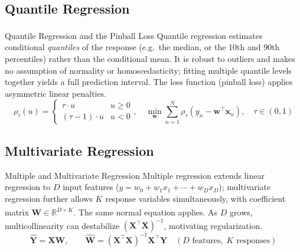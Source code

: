 \subsection{Quantile Regression}

\begin{v3topic}{Quantile Regression and the Pinball Loss}
    Quantile regression\textsuperscript{\cite{koenkerRegressionQuantiles1978}} estimates conditional \emph{quantiles} of the response (e.g.\ the median, or the 10th and 90th percentiles) rather than the conditional mean. It is robust to outliers and makes no assumption of normality or homoscedasticity; fitting multiple quantile levels together yields a full prediction interval. The loss function (pinball loss) applies asymmetric linear penalties.
\visualseparator
    \begin{equation}
        \rho_\tau(u) =
        \begin{cases}
            \tau \cdot u       & u \geq 0 \\
            (\tau - 1)\cdot u  & u < 0
        \end{cases},
        \quad
        \min_{\mathbf{w}} \sum_{n=1}^{N} \rho_\tau\!\left(y_n - \mathbf{w}^\top\mathbf{x}_n\right),
        \quad \tau \in (0,1)
    \end{equation}
\end{v3topic}

\subsection{Multivariate Regression}

\begin{v3topic}{Multiple and Multivariate Regression}
    Multiple regression extends linear regression to $D$ input features ($\hat{y} = w_0 + w_1 x_1 + \cdots + w_D x_D$); multivariate regression further allows $K$ response variables simultaneously, with coefficient matrix $\mathbf{W} \in \mathbb{R}^{D \times K}$\textsuperscript{\cite[][pp.~86--97]{iiiCourseMachineLearning}}. The same normal equation applies. As $D$ grows, multicollinearity can destabilize $(\mathbf{X}^\top\mathbf{X})^{-1}$, motivating regularization.
\visualseparator
    \begin{equation}
        \hat{\mathbf{Y}} = \mathbf{X}\mathbf{W},
        \qquad
        \hat{\mathbf{W}} = (\mathbf{X}^\top\mathbf{X})^{-1}\mathbf{X}^\top\mathbf{Y}
        \quad (D \text{ features},\; K \text{ responses})
    \end{equation}
\end{v3topic}

